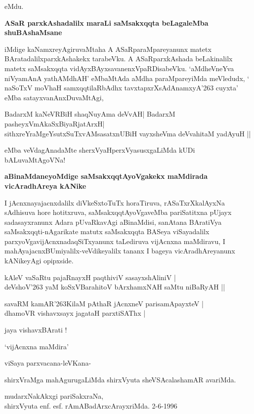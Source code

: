 \noindent
eMdu. 

{\bigskip
\noindent
{\large\bf ASaR parxkAshadalilx maraLi saMsakxqqta beLagaleMba shuBAshaMsane}}
\medskip


iMdige kaNamxreyAgiruvaMtaha A ASaRparaMpareyanunx matetx BAratadalilx\break parxkAshakekx tarabeVku. A ASaR\-parxkAshada beLakinalilx matetx saMsakxqqta vidAyxBAyxsa\-vanenxVpaRDisabeVku. `aMdheVneYva niVyamAnA yathAM\-dhAH\label{63}' eMbaMtAda aMdha paraMpareyiMda meVledudx, ` naSoTxV moVhaH samxqqtilaRbAdhx\label{63a} tavxtapxrXsAdAnamxyA\char'263 \-cuyxta' eMba satayxvanAnxDuvaMtAgi,

\begin{shloka}
BadarxM kaNeVRBiH shaqNuyAma deVvAH| BadarxM pasheyxVmAkaSxBiyaRjatArxH|\\\label{63b}
sithxreYraMgeYsutxSuTxvAMsasatxnUBiH vayxsheVma deVvahitaM yadAyuH ||
\end{shloka}

\noindent
eMba veVdagAnadaMte sherxVyaHperxVyasusxgaLiMda kUDi bALuvaMtAgoVNa!

{\bigskip
\noindent
{\large\bf aBinaMdaneyoMdige saMsakxqqtAyoVgakekx maMdirada vicAradhAreya kANike}}\label{page63}
\medskip

\noindent
I jAcnxnayajacnxdalilx diVkeSxtoTuTx horaTiruva, rASaTxrXkalAyxNa sAdhisuva hore hotitx\-ruva, saMsakxqqtA\-yoVga\-veMba pariSatitxna pUjayx sadasayxranunx Adara pUvaRkavAgi aBinaMdisi, sanAtana BAratiVya saMsakxqqti\--nAgari\-kate matutx saMsakxqqta BASeya viSayadalilx parxyoVgavijAcnxnadaqSiTxyanunx taLediruva vijAcnxna maMdi\-ravu, I mahAyajacnxBUmiyalilx-veVdikeyalilx tananx I bageya vicAradhAreyanunx kANikeyAgi opipxside.

\begin{shloka}
kAleV vaSaRtu pajaRnayxH paqthiviV sasayxshAliniV |\\\label{63c}
deVshoV\char'263 yaM koSxVBarahitoV bArxhamxNAH saMtu niBaRyAH ||
\end{shloka}

\begin{shloka}
savaRM kamAR\char'263KilaM pAthaR jAcnxneV parisamApayxteV |\\\label{63d}
dhamoVR vishavxsayx jagataH parxtiSAThx |\label{63e}
\end{shloka}

\begin{center}
jaya vishavxBArati !
\end{center}

\hfill `vijAcnxna maMdira'

\medskip
viSaya parxvacana-\hfill leVKana-

shirxVraMga mahAgurugaLiMda \hfill shirxVyuta sheVSAcalashamAR avariMda.

\medskip

\begin{center}
mudarxNakAkxgi pariSakxraNa,\\
shirxVyuta enf. esf. rAmABadArxcArayxriMda. 2-6-1996
\end{center}
